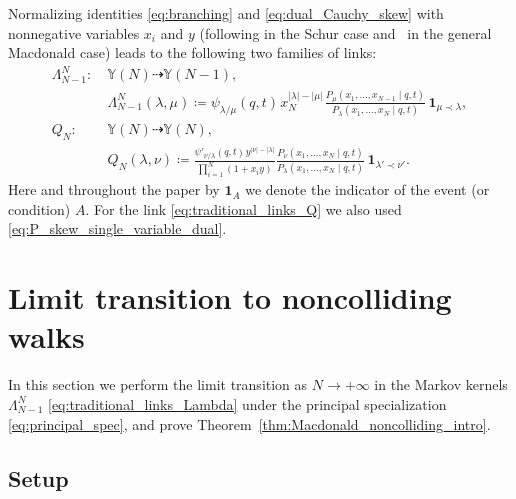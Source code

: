 \documentclass[11pt]{article}
\numberwithin{equation}{section}
\numberwithin{equation}{section}
\begin{document}
Normalizing identities
\eqref{eq:branching} and \eqref{eq:dual_Cauchy_skew}
with nonnegative variables $x_i$ and $y$
(following
\cite{Borodin2010Schur,BorFerr2008DF} in the Schur case and~\cite{BorodinCorwin2011Macdonald}
in the general Macdonald case)
leads to the following two families of links:
\begin{align}
\Lambda^{N}_{N-1}\colon \ & \mathbb{Y}(N)\dashrightarrow \mathbb{Y}(N-1),
		\nonumber\\
		& \Lambda^{N}_{N-1}(\lambda,\mu)\coloneqq
		\psi_{\lambda/\mu}(q,t)\hspace{1pt} x_N^{|\lambda|-|\mu|}\hspace{1pt}
		\frac{
		P_\mu(x_1,\dots,x_{N-1} \mid q,t )
		}
		{P_\lambda(x_1,\dots,x_N \mid q,t)}
		\,\mathbf{1}_{\mu\prec\lambda},\label{eq:traditional_links_Lambda}\\
Q_N\colon \ & \mathbb{Y}(N)\dashrightarrow \mathbb{Y}(N),
		\nonumber\\
		& Q_N(\lambda,\nu)\coloneqq
		\frac{\psi'_{\nu/\lambda}(q,t)
		\hspace{1pt}
		y^{|\nu|-|\lambda|}
		}
		{\prod_{i=1}^{N}(1+x_i y)}
		\frac
		{
		P_\nu(x_1,\dots,x_N\mid q,t )}
		{P_\lambda(x_1,\dots,x_N\mid q,t )}
		\,\mathbf{1}_{\lambda'\prec\nu'}		.\label{eq:traditional_links_Q}
\end{align}
Here and
throughout the paper by $\mathbf{1}_{A}$ we denote
the indicator of the event (or condition) $A$.
For the link \eqref{eq:traditional_links_Q}
we also used \eqref{eq:P_skew_single_variable_dual}.

\setcounter{section}{2}
\section{Limit transition to noncolliding walks}\label{sec:limit_transition}

In this section we perform the limit transition as $N\to+\infty$ in the
Markov kernels $\Lambda^{N}_{N-1}$ \eqref{eq:traditional_links_Lambda}
under the principal specialization
\eqref{eq:principal_spec}, and prove
Theorem~\ref{thm:Macdonald_noncolliding_intro}.

\subsection{Setup}\label{sub:limit_transition_setup}
\end{document}
